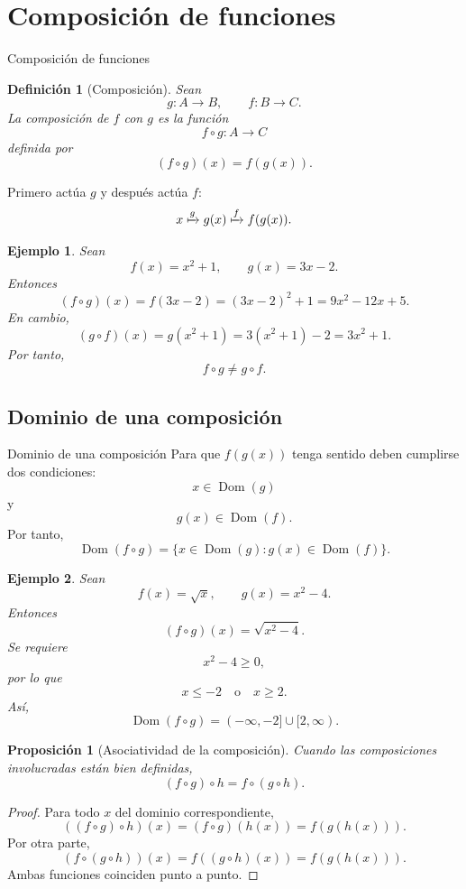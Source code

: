\documentclass[aspectratio=169,10pt]{beamer}
\newtheorem{definicion}{Definición}
\newtheorem{proposicion}{Proposición}
\newtheorem{ejemplo}{Ejemplo}
\newcommand{\Dom}{\operatorname{Dom}}
\begin{document}
\section{Composición de funciones}
\begin{frame}{Composición de funciones}
\begin{definicion}[Composición]
Sean
\[
g:A\to B,\qquad f:B\to C.
\]
La composición de $f$ con $g$ es la función
\[
f\circ g:A\to C
\]
definida por
\[
(f\circ g)(x)=f(g(x)).
\]
\end{definicion}

Primero actúa $g$ y después actúa $f$:
\[
x\xmapsto{g}g(x)\xmapsto{f}f(g(x)).
\]

\begin{ejemplo}
Sean
\[
f(x)=x^2+1,\qquad g(x)=3x-2.
\]
Entonces
\[
(f\circ g)(x)
=f(3x-2)
=(3x-2)^2+1
=9x^2-12x+5.
\]
En cambio,
\[
(g\circ f)(x)
=g(x^2+1)
=3(x^2+1)-2
=3x^2+1.
\]
Por tanto,
\[
f\circ g\neq g\circ f.
\]
\end{ejemplo}
\end{frame}
\subsection*{Dominio de una composición}
\begin{frame}{Dominio de una composición}
Para que $f(g(x))$ tenga sentido deben cumplirse dos condiciones:
\[
x\in\Dom(g)
\]
y
\[
g(x)\in\Dom(f).
\]
Por tanto,
\[
\Dom(f\circ g)
=
\{x\in\Dom(g):g(x)\in\Dom(f)\}.
\]

\begin{ejemplo}
Sean
\[
f(x)=\sqrt{x},\qquad g(x)=x^2-4.
\]
Entonces
\[
(f\circ g)(x)=\sqrt{x^2-4}.
\]
Se requiere
\[
x^2-4\geq0,
\]
por lo que
\[
x\leq-2\quad\text{o}\quad x\geq2.
\]
Así,
\[
\Dom(f\circ g)=(-\infty,-2]\cup[2,\infty).
\]
\end{ejemplo}

\begin{proposicion}[Asociatividad de la composición]
Cuando las composiciones involucradas están bien definidas,
\[
(f\circ g)\circ h=f\circ(g\circ h).
\]
\end{proposicion}

\begin{proof}
Para todo $x$ del dominio correspondiente,
\[
((f\circ g)\circ h)(x)
=(f\circ g)(h(x))
=f(g(h(x))).
\]
Por otra parte,
\[
(f\circ(g\circ h))(x)
=f((g\circ h)(x))
=f(g(h(x))).
\]
Ambas funciones coinciden punto a punto.
\end{proof}

\end{frame}
\end{document}

